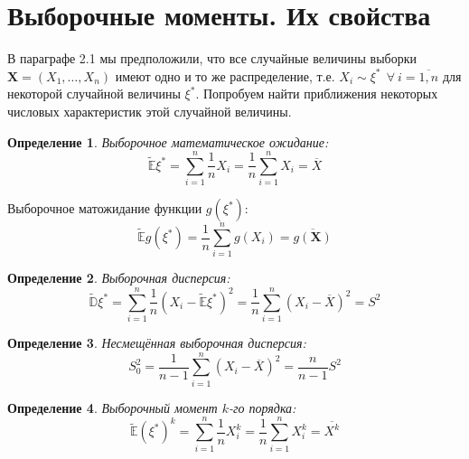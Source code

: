 \documentclass[oneside,final,14pt]{extreport}
\theoremstyle{plain}
\theoremstyle{definition}
\newtheorem*{defn}{Определение}
\theoremstyle{named}
\begin{document}
\section{Выборочные моменты. Их свойства}

В параграфе 2.1 мы предположили, что все случайные величины выборки $\mathbf{X} = \left(X_1, \ldots, X_n\right)$ имеют одно и то же распределение, т.е. $X_i \sim \xi^*~~\forall~i = \overline{1, n}$ для некоторой случайной величины $\xi^*$. Попробуем найти приближения некоторых числовых характеристик этой случайной величины.
\begin{defn}
{\it Выборочное математическое ожидание:} 
\begin{equation*}
    \tilde{\mathbb{E}} \xi^{*}=\sum\limits_{i=1}^{n} \frac{1}{n} X_{i}=\frac{1}{n} \sum\limits_{i=1}^{n} X_{i}=\overline{X}
\end{equation*}

Выборочное матожидание функции $g(\xi^{*})$:
\begin{equation*}
    \tilde{\mathbb{E}} g\left(\xi^{*}\right)=\frac{1}{n} \sum\limits_{i=1}^{n} g\left(X_{i}\right)=\overline{g(\mathbf{X})}
\end{equation*}
\end{defn}

\begin{defn}
{\it Выборочная дисперсия:}
\begin{equation*}
    \tilde{\mathbb{D}} \xi^{*}=\sum\limits_{i=1}^{n} \frac{1}{n}(X_{i}-\tilde{\mathbb{E}} \xi^{*})^{2}=\frac{1}{n} \sum\limits_{i=1}^{n}(X_{i}-\overline{X})^{2}=S^{2}
\end{equation*}
\end{defn}

\begin{defn}
{\it Несмещённая выборочная дисперсия:} 
\begin{equation*}
    S_{0}^{2}=\frac{1}{n-1} \sum\limits_{i=1}^{n}\left(X_{i}-\overline{X}\right)^{2} = \frac{n}{n-1} S^2
\end{equation*}
\end{defn}

\begin{defn}
{\it Выборочный момент $k$-го порядка:}
\begin{equation*}
    \tilde{\mathbb{E}}(\xi^{*})^{k}=\sum\limits_{i=1}^{n} \frac{1}{n} X_{i}^{k}=\frac{1}{n} \sum\limits_{i=1}^{n} X_{i}^{k}=\overline{X^{k}}
\end{equation*}
\end{defn}
\end{document}
